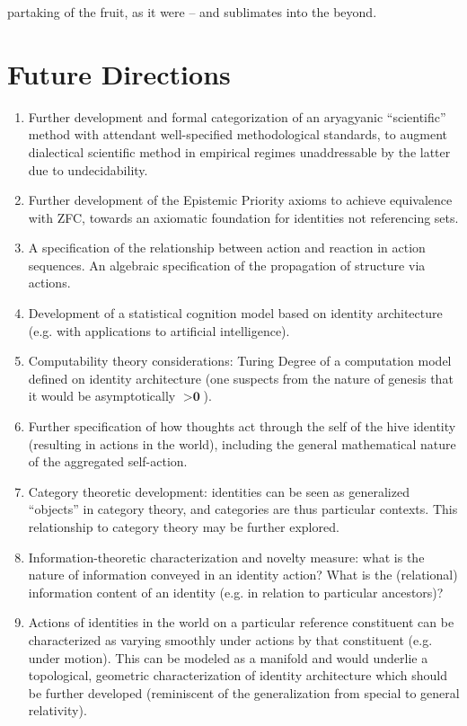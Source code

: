 \documentclass[pra,twocolumn,groupedaddress,10pt]{revtex4}
\theoremstyle{definition}
\begin{document}
partaking of the fruit, as it were -- and sublimates into the beyond.

\section{Future Directions} \label{sec:futdir}

\begin{enumerate}
	\item Further development and formal categorization of an aryagyanic ``scientific'' method with attendant well-specified methodological standards, to augment dialectical scientific method in empirical regimes unaddressable by the latter due to undecidability.
	\item Further development of the Epistemic Priority axioms to achieve equivalence with ZFC, towards an axiomatic foundation for identities not referencing sets.
	\item A specification of the relationship between action and reaction in action sequences. An algebraic specification of the propagation of structure via actions.
	\item Development of a statistical cognition model based on identity architecture (e.g. with applications to artificial intelligence).
	\item Computability theory considerations: Turing Degree of a computation model defined on identity architecture (one suspects from the nature of genesis that it would be asymptotically $> \textbf{0}$).
	\item Further specification of how thoughts act through the self of the hive identity (resulting in actions in the world), including the general mathematical nature of the aggregated self-action.
	\item Category theoretic development: identities can be seen as generalized ``objects'' in category theory, and categories are thus particular contexts. This relationship to category theory may be further explored.
	\item Information-theoretic characterization and novelty measure: what is the nature of information conveyed in an identity action? What is the (relational) information content of an identity (e.g. in relation to particular ancestors)?
	\item Actions of identities in the world on a particular reference constituent can be characterized as varying smoothly under actions by that constituent (e.g. under motion). This can be modeled as a manifold and would underlie a topological, geometric characterization of identity architecture which should be further developed (reminiscent of the generalization from special to general relativity).

\end{enumerate}
\end{document}
